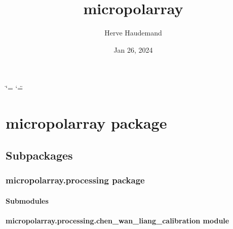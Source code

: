 \documentclass[letterpaper,10pt,english]{sphinxmanual}
\title{micropolarray}
\date{Jan 26, 2024}
\author{Herve Haudemand}
\begin{document}
\ifdefined\shorthandoff
  \ifnum\catcode`\=\string=\active\shorthandoff{=}\fi
  \ifnum\catcode`\"=\active{}\fi
\fi

\pagestyle{empty}
\sphinxmaketitle
\pagestyle{plain}
\sphinxtableofcontents
\pagestyle{normal}
\label{\detokenize{index::doc}}


\sphinxstepscope


\chapter{micropolarray package}
\label{\detokenize{micropolarray:micropolarray-package}}\label{\detokenize{micropolarray::doc}}

\section{Subpackages}
\label{\detokenize{micropolarray:subpackages}}
\sphinxstepscope


\subsection{micropolarray.processing package}
\label{\detokenize{micropolarray.processing:micropolarray-processing-package}}\label{\detokenize{micropolarray.processing::doc}}

\subsubsection{Submodules}
\label{\detokenize{micropolarray.processing:submodules}}

\subsubsection{micropolarray.processing.chen\_wan\_liang\_calibration module}
\label{\detokenize{micropolarray.processing:module-micropolarray.processing.chen_wan_liang_calibration}}\label{\detokenize{micropolarray.processing:micropolarray-processing-chen-wan-liang-calibration-module}}
\end{document}
